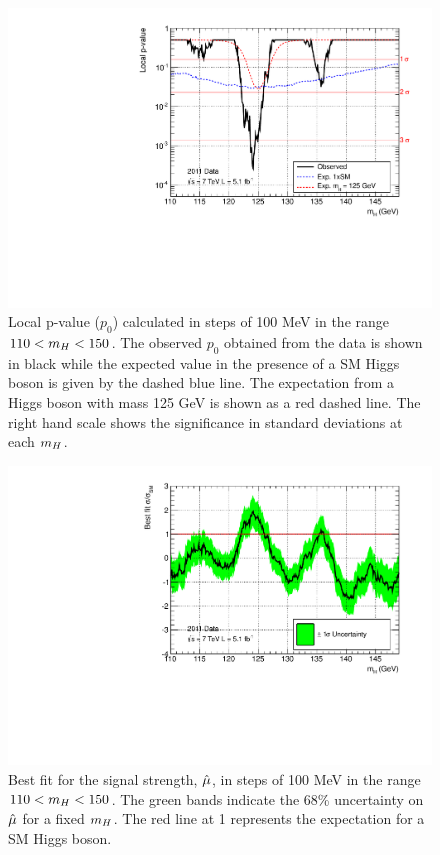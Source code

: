 \begin{figure}
\begin{center}
  \includegraphics[width=.8\textwidth]{hgg7TeV/statsPlots/pvals-100MeV.pdf}
\end{center}
 \caption{Local p-value ($p_{0}$) calculated in steps of 100 MeV in the range $110<m_{H}<150$. 
 The observed $p_{0}$ obtained from the data is shown in black while the expected value in the presence of a
 SM Higgs boson is given by the dashed blue line. The expectation from a Higgs boson with mass 125 GeV is shown as a red
 dashed line. The right hand scale shows the significance in standard deviations at each $m_{H}$.}
 \label{fig:pvals7TeV}
\end{figure}

\begin{figure}
\begin{center}
  \includegraphics[width=.8\textwidth]{hgg7TeV/statsPlots/maxlh-100MeV.pdf}
\end{center}
 \caption{Best fit for the signal strength, $\hat{\mu}$, in steps of 100 MeV in the range $110<m_{H}<150$.
 The green bands indicate the 68\% uncertainty on $\hat{\mu}$ for a fixed $m_{H}$.
 The red line at 1 represents the expectation for a SM Higgs boson.}
 \label{fig:muhat7TeV}
\end{figure}

